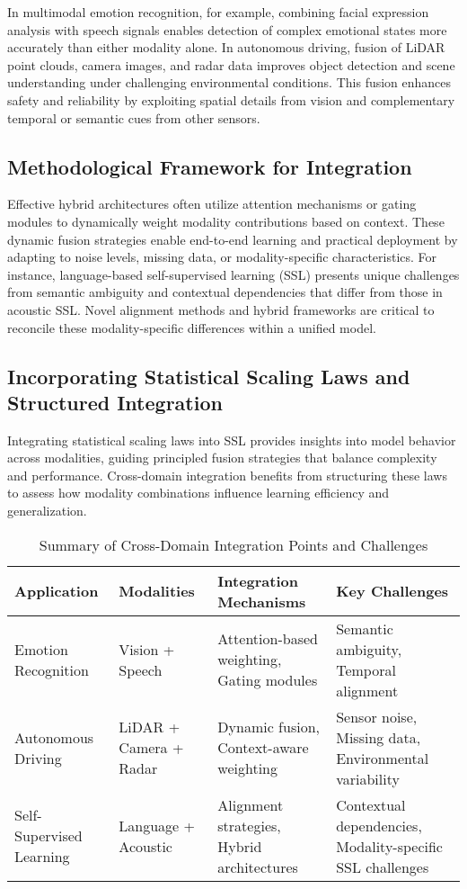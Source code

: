 \documentclass[sigconf]{acmart}
\begin{document}
In multimodal emotion recognition, for example, combining facial expression analysis with speech signals enables detection of complex emotional states more accurately than either modality alone. In autonomous driving, fusion of LiDAR point clouds, camera images, and radar data improves object detection and scene understanding under challenging environmental conditions. This fusion enhances safety and reliability by exploiting spatial details from vision and complementary temporal or semantic cues from other sensors.

\subsection{Methodological Framework for Integration}

Effective hybrid architectures often utilize attention mechanisms or gating modules to dynamically weight modality contributions based on context. These dynamic fusion strategies enable end-to-end learning and practical deployment by adapting to noise levels, missing data, or modality-specific characteristics. For instance, language-based self-supervised learning (SSL) presents unique challenges from semantic ambiguity and contextual dependencies that differ from those in acoustic SSL. Novel alignment methods and hybrid frameworks are critical to reconcile these modality-specific differences within a unified model.

\subsection{Incorporating Statistical Scaling Laws and Structured Integration}

Integrating statistical scaling laws into SSL provides insights into model behavior across modalities, guiding principled fusion strategies that balance complexity and performance. Cross-domain integration benefits from structuring these laws to assess how modality combinations influence learning efficiency and generalization.

\begin{table*}[htbp]
\centering
\caption{Summary of Cross-Domain Integration Points and Challenges}
\label{tab:integration_summary}
\begin{adjustbox}{max width=\textwidth}
\begin{tabular}{@{}llll@{}}
\toprule
\textbf{Application} & \textbf{Modalities} & \textbf{Integration Mechanisms} & \textbf{Key Challenges} \\ \midrule
Emotion Recognition & Vision + Speech & Attention-based weighting, Gating modules & Semantic ambiguity, Temporal alignment \\
Autonomous Driving & LiDAR + Camera + Radar & Dynamic fusion, Context-aware weighting & Sensor noise, Missing data, Environmental variability \\
Self-Supervised Learning & Language + Acoustic & Alignment strategies, Hybrid architectures & Contextual dependencies, Modality-specific SSL challenges \\
\bottomrule
\end{tabular}
\end{adjustbox}
\end{table*}
\end{document}
